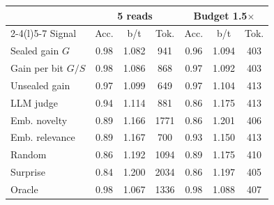 \begin{tabular}{@{}lcccccc@{}}
\toprule
 & \multicolumn{3}{c}{5 reads} & \multicolumn{3}{c}{Budget 1.5$\times$} \\
\cmidrule(lr){2-4}\cmidrule(l){5-7}
Signal & Acc. & b/t & Tok. & Acc. & b/t & Tok. \\
\midrule
Sealed gain $G$ & 0.98 & 1.082 & 941 & 0.96 & 1.094 & 403 \\
Gain per bit $G/S$ & 0.98 & 1.086 & 868 & 0.97 & 1.092 & 403 \\
Unsealed gain & 0.97 & 1.099 & 649 & 0.97 & 1.104 & 413 \\
LLM judge & 0.94 & 1.114 & 881 & 0.86 & 1.175 & 413 \\
Emb. novelty & 0.89 & 1.166 & 1771 & 0.86 & 1.201 & 406 \\
Emb. relevance & 0.89 & 1.167 & 700 & 0.93 & 1.150 & 413 \\
Random & 0.86 & 1.192 & 1094 & 0.89 & 1.175 & 410 \\
Surprise & 0.84 & 1.200 & 2034 & 0.86 & 1.197 & 405 \\
\midrule
Oracle & 0.98 & 1.067 & 1336 & 0.98 & 1.088 & 407 \\
\bottomrule
\end{tabular}
